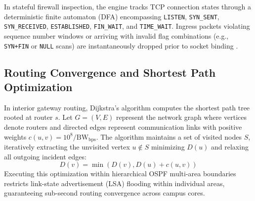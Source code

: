 In stateful firewall inspection, the engine tracks TCP connection states through a deterministic finite automaton (DFA) encompassing \texttt{LISTEN}, \texttt{SYN\_SENT}, \texttt{SYN\_RECEIVED}, \texttt{ESTABLISHED}, \texttt{FIN\_WAIT}, and \texttt{TIME\_WAIT}. Ingress packets violating sequence number windows or arriving with invalid flag combinations (e.g., \texttt{SYN+FIN} or \texttt{NULL} scans) are instantaneously dropped prior to socket binding \cite{roesch1999snort}.

\subsection{Routing Convergence and Shortest Path Optimization}
In interior gateway routing, Dijkstra's algorithm computes the shortest path tree rooted at router $s$. Let $G=(V, E)$ represent the network graph where vertices denote routers and directed edges represent communication links with positive weights $c(u, v) = 10^8 / \text{BW}_{\text{bps}}$. The algorithm maintains a set of visited nodes $S$, iteratively extracting the unvisited vertex $u \notin S$ minimizing $D(u)$ and relaxing all outgoing incident edges:
\begin{equation}
  D(v) = \min(D(v), D(u) + c(u, v))
\end{equation}
Executing this optimization within hierarchical OSPF multi-area boundaries restricts link-state advertisement (LSA) flooding within individual areas, guaranteeing sub-second routing convergence across campus cores.
